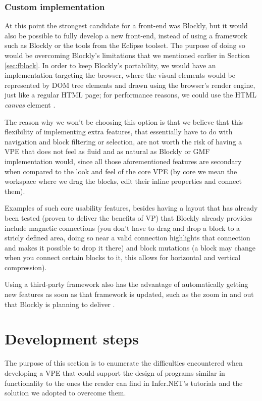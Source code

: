 \subsubsection{Custom implementation}

At this point the strongest candidate for a front-end was Blockly,
but it would also be possible to fully develop a new front-end, instead of using
a framework such as Blockly or the tools from the Eclipse toolset. The purpose of
doing so would be overcoming Blockly's limitations that we mentioned earlier in
Section \ref{sec:fblock}. In order to keep Blockly's portability, we would have an
implementation targeting the browser, where the visual elements would be
represented by DOM tree elements and drawn using the browser's render engine,
just like a regular HTML page; for performance reasons, we could use the HTML
\textit{canvas} element \cite{w3ccanvas}.

The reason why we won't be choosing this option is that we believe that this
flexibility of implementing extra features, that essentially have to do with
navigation and block filtering or selection, are not worth the risk of having
a VPE that does not feel as fluid and as natural as Blockly or GMF implementation would, since all
those aforementioned features are secondary when compared to the look and feel
of the core VPE (by core we mean the workspace where we drag the blocks, edit
their inline properties and connect them).

Examples of such core usability features, besides having a layout that has already been
tested (proven to deliver the benefits of VP)
that Blockly already provides include magnetic connections
(you don't have to drag and drop a block to a stricly defined area, doing so near
a valid connection highlights that connection and makes it possible to drop it there)
and block mutations (a block may change when you connect certain blocks to it,
this allows for horizontal and vertical compression).

Using a third-party framework also has the advantage of automatically getting new
features as soon as that framework is updated, such as the zoom in and out that
Blockly is planning to deliver \cite{blockly}.

\section{Development steps}

The purpose of this section is to enumerate the difficulties encountered when
developing a VPE that could support the design of programs similar in functionality
to the ones the reader can find in Infer.NET's tutorials \cite{InferNET14t} and
the solution we adopted to overcome them.

